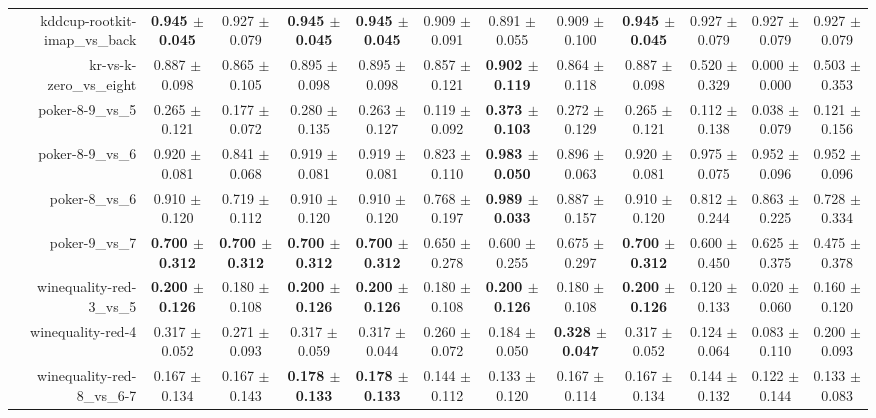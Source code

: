 \begin{table}[!ht]
{\begin{tabular}{r c c c c c c c c c c c}
kddcup-rootkit-imap\_vs\_back & \textbf{0.945 $\pm$ 0.045} & 0.927 $\pm$ 0.079 & \textbf{0.945 $\pm$ 0.045} & \textbf{0.945 $\pm$ 0.045} & 0.909 $\pm$ 0.091 & 0.891 $\pm$ 0.055 & 0.909 $\pm$ 0.100 & \textbf{0.945 $\pm$ 0.045} & 0.927 $\pm$ 0.079 & 0.927 $\pm$ 0.079 & 0.927 $\pm$ 0.079 \\
kr-vs-k-zero\_vs\_eight & 0.887 $\pm$ 0.098 & 0.865 $\pm$ 0.105 & 0.895 $\pm$ 0.098 & 0.895 $\pm$ 0.098 & 0.857 $\pm$ 0.121 & \textbf{0.902 $\pm$ 0.119} & 0.864 $\pm$ 0.118 & 0.887 $\pm$ 0.098 & 0.520 $\pm$ 0.329 & 0.000 $\pm$ 0.000 & 0.503 $\pm$ 0.353 \\
poker-8-9\_vs\_5 & 0.265 $\pm$ 0.121 & 0.177 $\pm$ 0.072 & 0.280 $\pm$ 0.135 & 0.263 $\pm$ 0.127 & 0.119 $\pm$ 0.092 & \textbf{0.373 $\pm$ 0.103} & 0.272 $\pm$ 0.129 & 0.265 $\pm$ 0.121 & 0.112 $\pm$ 0.138 & 0.038 $\pm$ 0.079 & 0.121 $\pm$ 0.156 \\
poker-8-9\_vs\_6 & 0.920 $\pm$ 0.081 & 0.841 $\pm$ 0.068 & 0.919 $\pm$ 0.081 & 0.919 $\pm$ 0.081 & 0.823 $\pm$ 0.110 & \textbf{0.983 $\pm$ 0.050} & 0.896 $\pm$ 0.063 & 0.920 $\pm$ 0.081 & 0.975 $\pm$ 0.075 & 0.952 $\pm$ 0.096 & 0.952 $\pm$ 0.096 \\
poker-8\_vs\_6 & 0.910 $\pm$ 0.120 & 0.719 $\pm$ 0.112 & 0.910 $\pm$ 0.120 & 0.910 $\pm$ 0.120 & 0.768 $\pm$ 0.197 & \textbf{0.989 $\pm$ 0.033} & 0.887 $\pm$ 0.157 & 0.910 $\pm$ 0.120 & 0.812 $\pm$ 0.244 & 0.863 $\pm$ 0.225 & 0.728 $\pm$ 0.334 \\
poker-9\_vs\_7 & \textbf{0.700 $\pm$ 0.312} & \textbf{0.700 $\pm$ 0.312} & \textbf{0.700 $\pm$ 0.312} & \textbf{0.700 $\pm$ 0.312} & 0.650 $\pm$ 0.278 & 0.600 $\pm$ 0.255 & 0.675 $\pm$ 0.297 & \textbf{0.700 $\pm$ 0.312} & 0.600 $\pm$ 0.450 & 0.625 $\pm$ 0.375 & 0.475 $\pm$ 0.378 \\
winequality-red-3\_vs\_5 & \textbf{0.200 $\pm$ 0.126} & 0.180 $\pm$ 0.108 & \textbf{0.200 $\pm$ 0.126} & \textbf{0.200 $\pm$ 0.126} & 0.180 $\pm$ 0.108 & \textbf{0.200 $\pm$ 0.126} & 0.180 $\pm$ 0.108 & \textbf{0.200 $\pm$ 0.126} & 0.120 $\pm$ 0.133 & 0.020 $\pm$ 0.060 & 0.160 $\pm$ 0.120 \\
winequality-red-4 & 0.317 $\pm$ 0.052 & 0.271 $\pm$ 0.093 & 0.317 $\pm$ 0.059 & 0.317 $\pm$ 0.044 & 0.260 $\pm$ 0.072 & 0.184 $\pm$ 0.050 & \textbf{0.328 $\pm$ 0.047} & 0.317 $\pm$ 0.052 & 0.124 $\pm$ 0.064 & 0.083 $\pm$ 0.110 & 0.200 $\pm$ 0.093 \\
winequality-red-8\_vs\_6-7 & 0.167 $\pm$ 0.134 & 0.167 $\pm$ 0.143 & \textbf{0.178 $\pm$ 0.133} & \textbf{0.178 $\pm$ 0.133} & 0.144 $\pm$ 0.112 & 0.133 $\pm$ 0.120 & 0.167 $\pm$ 0.114 & 0.167 $\pm$ 0.134 & 0.144 $\pm$ 0.132 & 0.122 $\pm$ 0.144 & 0.133 $\pm$ 0.083 \\

\end{tabular}}
\end{table}
